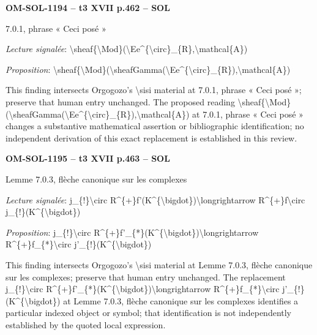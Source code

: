 \par\noindent\textbf{OM-SOL-1194 -- t3 XVII p.462 -- SOL}\par
7.0.1, phrase « Ceci posé »\par
\emph{Lecture signalée}: \textbackslash{}sheaf\{\textbackslash{}Mod\}(\textbackslash{}Ee\textasciicircum{}\{\textbackslash{}circ\}\_\{R\},\textbackslash{}mathcal\{A\})\par
\emph{Proposition}: \textbackslash{}sheaf\{\textbackslash{}Mod\}(\textbackslash{}sheafGamma(\textbackslash{}Ee\textasciicircum{}\{\textbackslash{}circ\}\_\{R\}),\textbackslash{}mathcal\{A\})\par
This finding intersects Orgogozo's \textbackslash{}sisi material at 7.0.1, phrase « Ceci posé »; preserve that human entry unchanged. The proposed reading \textbackslash{}sheaf\{\textbackslash{}Mod\}(\textbackslash{}sheafGamma(\textbackslash{}Ee\textasciicircum{}\{\textbackslash{}circ\}\_\{R\}),\textbackslash{}mathcal\{A\}) at 7.0.1, phrase « Ceci posé » changes a substantive mathematical assertion or bibliographic identification; no independent derivation of this exact replacement is established in this review.\par
\par\noindent\textbf{OM-SOL-1195 -- t3 XVII p.463 -- SOL}\par
Lemme 7.0.3, flèche canonique sur les complexes\par
\emph{Lecture signalée}: j\_\{!\}\textbackslash{}circ R\textasciicircum{}\{+\}f'(K\textasciicircum{}\{\textbackslash{}bigdot\})\textbackslash{}longrightarrow R\textasciicircum{}\{+\}f\textbackslash{}circ j\_\{!\}(K\textasciicircum{}\{\textbackslash{}bigdot\})\par
\emph{Proposition}: j\_\{!\}\textbackslash{}circ R\textasciicircum{}\{+\}f'\_\{*\}(K\textasciicircum{}\{\textbackslash{}bigdot\})\textbackslash{}longrightarrow R\textasciicircum{}\{+\}f\_\{*\}\textbackslash{}circ j'\_\{!\}(K\textasciicircum{}\{\textbackslash{}bigdot\})\par
This finding intersects Orgogozo's \textbackslash{}sisi material at Lemme 7.0.3, flèche canonique sur les complexes; preserve that human entry unchanged. The replacement j\_\{!\}\textbackslash{}circ R\textasciicircum{}\{+\}f'\_\{*\}(K\textasciicircum{}\{\textbackslash{}bigdot\})\textbackslash{}longrightarrow R\textasciicircum{}\{+\}f\_\{*\}\textbackslash{}circ j'\_\{!\}(K\textasciicircum{}\{\textbackslash{}bigdot\}) at Lemme 7.0.3, flèche canonique sur les complexes identifies a particular indexed object or symbol; that identification is not independently established by the quoted local expression.\par
